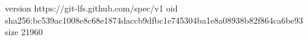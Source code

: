 version https://git-lfs.github.com/spec/v1
oid sha256:bc539ac1008e8c68e1874daccb9dfbc1e745304ba1e8a08938b82f864ca6be93
size 21960
